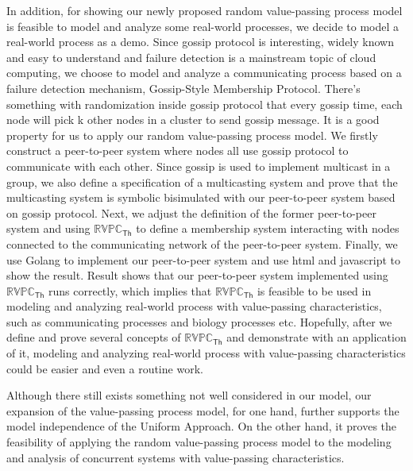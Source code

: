 \begin{digest}
  In addition, for showing our newly proposed random value-passing process model is feasible to model and analyze some real-world processes, we decide to model a real-world process as a demo. Since gossip protocol is interesting, widely known and easy to understand and failure detection is a mainstream topic of cloud computing, we choose to model and analyze a communicating process based on a failure detection mechanism, Gossip-Style Membership Protocol. There’s something with randomization inside gossip protocol that every gossip time, each node will pick k other nodes in a cluster to send gossip message. It is a good property for us to apply our random value-passing process model. We firstly construct a peer-to-peer system where nodes all use gossip protocol to communicate with each other. Since gossip is used to implement multicast in a group, we also define a specification of a multicasting system and prove that the multicasting system is symbolic bisimulated with our peer-to-peer system based on gossip protocol. Next, we adjust the definition of the former peer-to-peer system and using $\mathbb{RVPC}_{\mathsf{Th}}$ to define a membership system interacting with nodes connected to the communicating network of the peer-to-peer system. Finally, we use Golang to implement our peer-to-peer system and use html and javascript to show the result. Result shows that our peer-to-peer system implemented using $\mathbb{RVPC}_{\mathsf{Th}}$ runs correctly, which implies that $\mathbb{RVPC}_{\mathsf{Th}}$ is feasible to be used in modeling and analyzing real-world process with value-passing characteristics, such as communicating processes and biology processes etc. Hopefully, after we define and prove several concepts of $\mathbb{RVPC}_{\mathsf{Th}}$ and demonstrate with an application of it, modeling and analyzing real-world process with value-passing characteristics could be easier and even a routine work.

  Although there still exists something not well considered in our model, our expansion of the value-passing process model, for one hand, further supports the model independence of the Uniform Approach. On the other hand, it proves the feasibility of applying the random value-passing process model to the modeling and analysis of concurrent systems with value-passing characteristics.

\end{digest}
